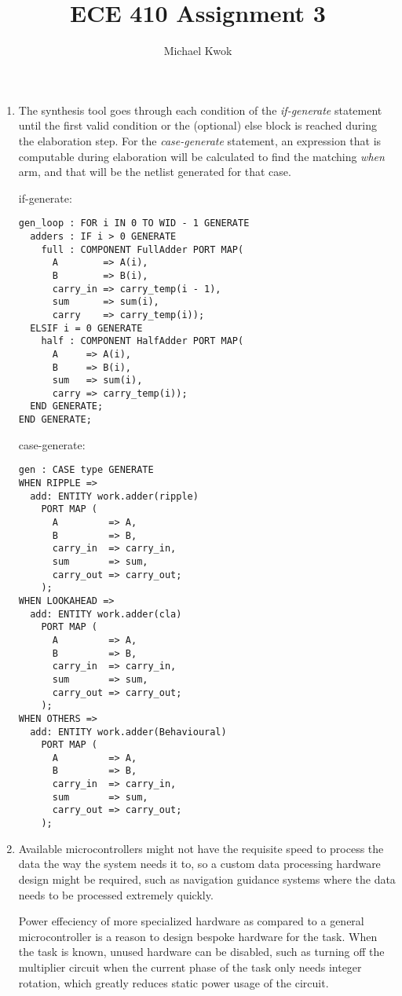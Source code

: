 \documentclass{article}
\title{ECE 410 Assignment 3}
\author{Michael Kwok}
\begin{document}
\maketitle
\begin{enumerate}
  \item The synthesis tool goes through each condition of the \textit{if-generate} statement until the first valid condition or the (optional) else block is reached during the elaboration step. For the \textit{case-generate} statement, an expression that is computable during elaboration will be calculated to find the matching \textit{when} arm, and that will be the netlist generated for that case.

        if-generate:
        \begin{verbatim}
gen_loop : FOR i IN 0 TO WID - 1 GENERATE
  adders : IF i > 0 GENERATE
    full : COMPONENT FullAdder PORT MAP(
      A        => A(i),
      B        => B(i),
      carry_in => carry_temp(i - 1),
      sum      => sum(i),
      carry    => carry_temp(i));
  ELSIF i = 0 GENERATE
    half : COMPONENT HalfAdder PORT MAP(
      A     => A(i),
      B     => B(i),
      sum   => sum(i),
      carry => carry_temp(i));
  END GENERATE;
END GENERATE;      
        \end{verbatim}

        case-generate:
        \begin{verbatim}
gen : CASE type GENERATE
WHEN RIPPLE => 
  add: ENTITY work.adder(ripple)
    PORT MAP (
      A         => A,
      B         => B,
      carry_in  => carry_in,
      sum       => sum,
      carry_out => carry_out;
    );
WHEN LOOKAHEAD => 
  add: ENTITY work.adder(cla)
    PORT MAP (
      A         => A,
      B         => B,
      carry_in  => carry_in,
      sum       => sum,
      carry_out => carry_out;
    );
WHEN OTHERS => 
  add: ENTITY work.adder(Behavioural)
    PORT MAP (
      A         => A,
      B         => B,
      carry_in  => carry_in,
      sum       => sum,
      carry_out => carry_out;
    );
        \end{verbatim}

  \item Available microcontrollers might not have the requisite speed to process the data the way the system needs it to, so a custom data processing hardware design might be required, such as navigation guidance systems where the data needs to be processed extremely quickly.

        Power effeciency of more specialized hardware as compared to a general microcontroller is a reason to design bespoke hardware for the task. When the task is known, unused hardware can be disabled, such as turning off the multiplier circuit when the current phase of the task only needs integer rotation, which greatly reduces static power usage of the circuit.


\end{enumerate}
\end{document}
